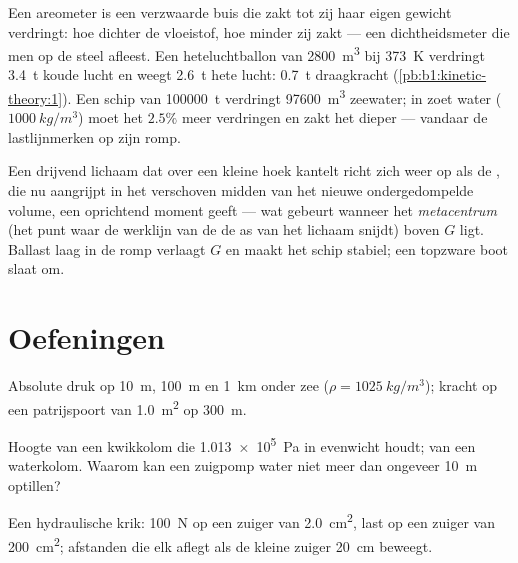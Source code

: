 \begin{example}\label{ex:b1:fluid-statics:buoy}
Een areometer is een verzwaarde buis die zakt tot zij haar eigen gewicht
verdringt: hoe dichter de vloeistof, hoe minder zij zakt --- een dichtheidsmeter
die men op de steel afleest. Een heteluchtballon van \qty{2800}{m^3} bij \qty{373}{K} verdringt
\qty{3.4}{t} koude lucht en weegt \qty{2.6}{t} hete lucht: \qty{0.7}{t}
draagkracht (\cref{pb:b1:kinetic-theory:1}). Een schip van \qty{100000}{t}
verdringt \qty{97600}{m^3} zeewater; in zoet water ($\qty{1000}{kg/m^3}$)
moet het $2.5\%$ meer verdringen en zakt het dieper --- vandaar de lastlijnmerken op
zijn romp.
\end{example}

\begin{remark}[Stabiliteit]\label{rem:b1:fluid-statics:stability}
Een drijvend lichaam dat over een kleine hoek kantelt richt zich weer op als de
, die nu aangrijpt in het verschoven midden van het nieuwe
ondergedompelde volume, een oprichtend moment geeft --- wat gebeurt wanneer het
\emph{metacentrum} (het punt waar de werklijn van de  de as van
het lichaam snijdt) boven $G$ ligt. Ballast laag in de romp verlaagt $G$ en maakt
het schip stabiel; een topzware boot slaat om.
\end{remark}

\section{Oefeningen}

\begin{exercise}[$\star$]\label{exo:b1:fluid-statics:1}
Absolute druk op \qty{10}{m}, \qty{100}{m} en \qty{1}{km} onder
zee ($\rho = \qty{1025}{kg/m^3}$); kracht op een patrijspoort van \qty{1.0}{m^2} op
\qty{300}{m}.
\end{exercise}

\begin{exercise}[$\star$]\label{exo:b1:fluid-statics:2}
Hoogte van een kwikkolom die \qty{1.013e5}{Pa} in evenwicht houdt; van een waterkolom.
Waarom kan een zuigpomp water niet meer dan ongeveer \qty{10}{m} optillen?
\end{exercise}

\begin{exercise}[$\star$]\label{exo:b1:fluid-statics:3}
Een hydraulische krik: \qty{100}{N} op een zuiger van \qty{2.0}{cm^2}, last op een
zuiger van \qty{200}{cm^2}; afstanden die elk aflegt als de kleine zuiger
\qty{20}{cm} beweegt.
\end{exercise}

